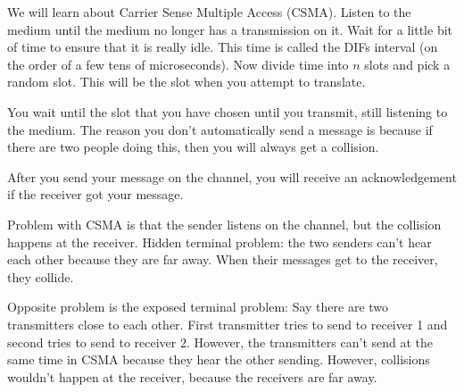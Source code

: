 \documentclass[psamsfonts]{amsart}
\begin{document}
We will learn about Carrier Sense Multiple Access (CSMA). Listen to the medium until the medium no longer has a transmission on it. Wait for a little bit of time to ensure that it is really idle. This time is called the DIFs interval (on the order of a few tens of microseconds). Now divide time into $n$ slots and pick a random slot. This will be the slot when you attempt to translate.

You wait until the slot that you have chosen until you transmit, still listening to the medium. The reason you don't automatically send a message is because if there are two people doing this, then you will always get a collision.

After you send your message on the channel, you will receive an acknowledgement if the receiver got your message.

Problem with CSMA is that the sender listens on the channel, but the collision happens at the receiver. Hidden terminal problem: the two senders can't hear each other because they are far away. When their messages get to the receiver, they collide.

Opposite problem is the exposed terminal problem: Say there are two transmitters close to each other. First transmitter tries to send to receiver 1 and second tries to send to receiver 2. However, the transmitters can't send at the same time in CSMA because they hear the other sending. However, collisions wouldn't happen at the receiver, because the receivers are far away.
\end{document}
